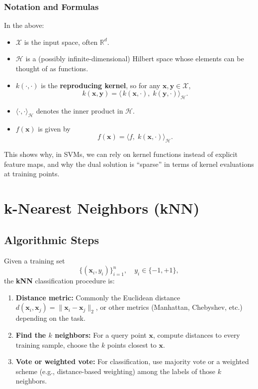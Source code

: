 \documentclass[11pt]{article}
\begin{document}
\subsubsection{Notation and Formulas}

In the above:
\begin{itemize}
    \item \(\mathcal{X}\) is the input space, often \(\mathbb{R}^d\).
    \item \(\mathcal{H}\) is a (possibly infinite-dimensional) Hilbert space whose elements can be thought of as functions.
    \item \(k(\cdot,\cdot)\) is the \textbf{reproducing kernel}, so for any \(\mathbf{x}, \mathbf{y}\in\mathcal{X}\),
    \[
    k(\mathbf{x}, \mathbf{y}) 
    = \langle\,k(\mathbf{x}, \cdot),\; k(\mathbf{y}, \cdot)\rangle_{\mathcal{H}}.
    \]
    \item \(\langle \cdot,\cdot\rangle_{\mathcal{H}}\) denotes the inner product in \(\mathcal{H}\).
    \item \(f(\mathbf{x})\) is given by 
    \[
    f(\mathbf{x}) 
    = \langle f,\; k(\mathbf{x}, \cdot)\rangle_{\mathcal{H}}.
    \]
\end{itemize}
This shows why, in SVMs, we can rely on kernel functions instead of explicit feature maps, and why the dual solution is “sparse” in terms of kernel evaluations at training points.

\section{k-Nearest Neighbors (kNN)}

\subsection{Algorithmic Steps}

Given a training set
\[
\{(\mathbf{x}_i, y_i)\}_{i=1}^n, \quad y_i \in \{-1, +1\},
\]
the \textbf{kNN} classification procedure is:
\begin{enumerate}
    \item \textbf{Distance metric:} Commonly the Euclidean distance \(d(\mathbf{x}_i, \mathbf{x}_j) = \|\mathbf{x}_i - \mathbf{x}_j\|_2\), or other metrics (Manhattan, Chebyshev, etc.) depending on the task.
    \item \textbf{Find the \(k\) neighbors:} For a query point \(\mathbf{x}\), compute distances to every training sample, choose the \(k\) points closest to \(\mathbf{x}\).
    \item \textbf{Vote or weighted vote:} For classification, use majority vote or a weighted scheme (e.g., distance-based weighting) among the labels of those \(k\) neighbors.
\end{enumerate}
\end{document}
